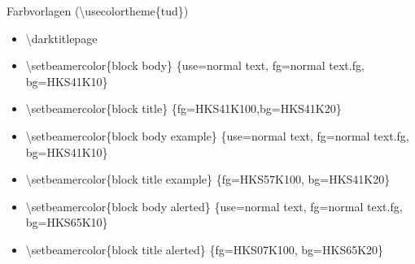 \documentclass[presentation,t]{beamer}
\begin{document}
\begin{frame}[allowframebreaks]{Farbvorlagen (\textbackslash usecolortheme\{tud\})}
\begin{itemize}
\begin{itemize}
    text/titlepage, fg=normal text/titlepage.fg\}%
\item \textbackslash setbeamercolor\{subtitle\} \{use=normal
     text/titlepagexo, fg=normal text/titlepage.fg\}%
\item \textbackslash setbeamercolor\{author/titlepage\} \{use=normal
     text/titlepage, fg=normal text/titlepage.fg\}%
\item \textbackslash setbeamercolor\{headline/titlepage\} \{use=normal
     text/titlepage, fg=normal text/titlepage.fg\}%
\item \textbackslash setbeamercolor\{logo/titlepage\} \{use=normal
     text/titlepage, fg=normal text/titlepage.fg\}%
\item \textbackslash setbeamercolor\{einrichtung/titlepage\} \{fg=HKS92K100\}%
\item \textbackslash setbeamercolor\{fachrichtung/titlepage\}
     \{use=einrichtung/titlepage, fg=einrichtung/titlepage.fg\}%
\item \textbackslash setbeamercolor\{institut/titlepage\}
     \{use=einrichtung/titlepage, fg=einrichtung/titlepage.fg\}%
\item \textbackslash setbeamercolor\{professur/titlepage\}
     \{use=einrichtung/titlepage, fg=einrichtung/titlepage.fg\}%
\item \textbackslash setbeamercolor\{upper separation line
     head/titlepage\} \{fg=HKS92K100\}%
\item \textbackslash setbeamercolor\{lower separation line head/titlepage\}%
      \{use=upper separation line head/titlepage,fg=upper separation line
        head/titlepage.fg\}%
\item \textbackslash setbeamercolor\{date in head/foot/titlepage\} \{fg=HKS92K100\}%
\item \textbackslash let\textbackslash logo\@ DDC\textbackslash logo\@ DDC\@ bunt%
\item \textbackslash let\textbackslash logo\@ DDCf\textbackslash logo\@ DDC\@ colorf
     \}
\end{itemize}
\item \textbackslash darktitlepage

\item \textbackslash setbeamercolor\{block body\} \{use=normal text,
   fg=normal text.fg, bg=HKS41K10\}
\item \textbackslash setbeamercolor\{block title\} \{fg=HKS41K100,bg=HKS41K20\}
\item \textbackslash setbeamercolor\{block body example\} \{use=normal
   text, fg=normal text.fg, bg=HKS41K10\}
\item \textbackslash setbeamercolor\{block title example\}
   \{fg=HKS57K100, bg=HKS41K20\}
\item \textbackslash setbeamercolor\{block body alerted\} \{use=normal
   text, fg=normal text.fg, bg=HKS65K10\}
\item \textbackslash setbeamercolor\{block title alerted\}
   \{fg=HKS07K100, bg=HKS65K20\}
\end{itemize}
\end{frame}
\end{document}
